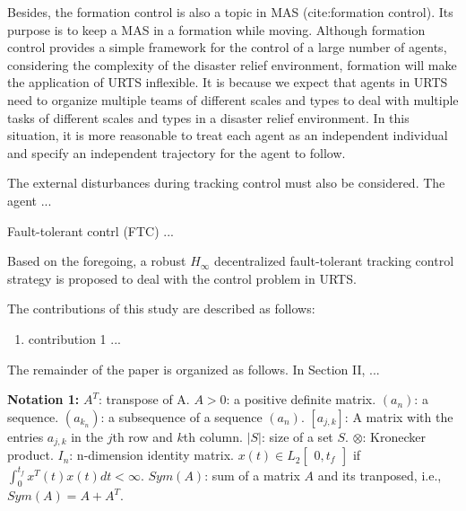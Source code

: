 \documentclass{ieeeaccess}
\begin{document}
Besides, the formation control is also a topic in MAS (cite:formation control). Its purpose is to keep a MAS in a formation while moving. Although formation control provides a simple framework for the control of a large number of agents, considering the complexity of the disaster relief environment, formation will make the application of URTS inflexible. It is because we expect that agents in URTS need to organize multiple teams of different scales and types to deal with multiple tasks of different scales and types in a disaster relief environment. In this situation, it is more reasonable to treat each agent as an independent individual and specify an independent trajectory for the agent to follow.

The external disturbances during tracking control must also be considered. The agent ...

Fault-tolerant contrl (FTC) ...

Based on the foregoing, a robust $H_\infty$ decentralized fault-tolerant tracking control strategy is proposed to deal with the control problem in URTS.


The contributions of this study are described as follows:
\begin{enumerate}
    \item contribution 1 ...
\end{enumerate}

The remainder of the paper is organized as follows. In Section II, ...

\textbf{Notation 1:} 
$A^T$: transpose of A. $A > 0$: a positive definite matrix. $(a_n)$: a sequence. $(a_{k_n})$: a subsequence of a sequence $(a_n)$. $[a_{j,k}]$: A matrix with the entries $a_{j,k}$ in the $j$th row and $k$th column. $\vert{S}\vert$: size of a set $S$. $\otimes$: Kronecker product. $I_n$: n-dimension identity matrix. $x(t)\in L_2\begin{bmatrix}
    0,t_f 
\end{bmatrix}$ if $\int^{t_f}_{0}x^T(t)x(t)dt<\infty$. $Sym(A)$: sum of a matrix $A$ and its tranposed, i.e., $Sym(A) = A+A^T$.
\end{document}
